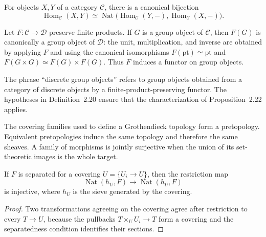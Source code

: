 \begin{remark}\label{fga-rem-2-10}\uses{}
For objects $X,Y$ of a category $\mathcal C$, there is a canonical bijection
\[
\operatorname{Hom}_{\mathcal C}(X,Y)
\simeq\operatorname{Nat}\bigl(\operatorname{Hom}_{\mathcal C}(Y,-),
\operatorname{Hom}_{\mathcal C}(X,-)\bigr).
\]
\end{remark}

\begin{remark}\label{fga-rem-2-14}\uses{}
Let $F:\mathcal C\to\mathcal D$ preserve finite products.  If $G$ is a group
object of $\mathcal C$, then $F(G)$ is canonically a group object of $\mathcal D$:
the unit, multiplication, and inverse are obtained by applying $F$ and using
the canonical isomorphisms $F(\mathrm{pt})\simeq\mathrm{pt}$ and
$F(G\times G)\simeq F(G)\times F(G)$.  Thus $F$ induces a functor on group
objects.
\end{remark}

\begin{remark}\label{fga-rem-2-23}\uses{}
The phrase ``discrete group objects'' refers to group objects obtained from a
category of discrete objects by a finite-product-preserving functor.  The
hypotheses in Definition~2.20 ensure that the characterization of
Proposition~2.22 applies.
\end{remark}

\begin{remark}\label{fga-rem-2-25}\uses{}
The covering families used to define a Grothendieck topology form a
pretopology.  Equivalent pretopologies induce the same topology and therefore
the same sheaves.  A family of morphisms is jointly surjective when the union
of its set-theoretic images is the whole target.
\end{remark}

\begin{lemma}\label{fga-lem-2-43}
If $F$ is separated for a covering $U=\{U_i\to U\}$, then the restriction map
\[
\operatorname{Nat}(h_U,F)\longrightarrow
\operatorname{Nat}(h_{\!U},F)
\]
is injective, where $h_{\!U}$ is the sieve generated by the covering.
\end{lemma}
\begin{proof}
Two transformations agreeing on the covering agree after restriction to every
$T\to U$, because the pullbacks $T\times_UU_i\to T$ form a covering and the
separatedness condition identifies their sections.
\end{proof}

